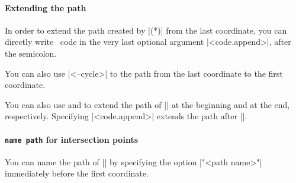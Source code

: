 \paragraph{Extending the path} In order to extend the path created by |\tzplotcurve(*)| from the last coordinate, you can directly write \Tikz\ code in the very last optional argument |<code.append>|, after the semicolon.

\begin{tzcode}{.3}
\end{tzcode}

You can also use |<--cycle>| to  the path  from the last coordinate to the first coordinate.

\begin{tzcode}{.3}
\end{tzcode}

You can also use \icmd{\tzplotcurveAtBegin} and \icmd{\tzplotcurveAtEnd} to extend the path of |\tzplotcurve| at the beginning and at the end, respectively.
Specifying |<code.append>| extends the path after |\tzplotcurveAtEnd|.

\begin{tzcode}{.3}
\end{tzcode}

\paragraph{\texttt{name path} for intersection points}
You can name the path of |\tzplotcurve| by specifying the option |"<path name>"| immediately before the first coordinate.

